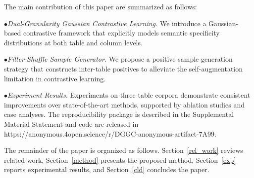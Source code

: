 The main contribution of this paper are summarized as follows:

\noindent $\bullet$\textit{Dual-Granularity Gaussian Contrastive Learning.} We introduce a Gaussian-based contrastive framework that explicitly models semantic specificity distributions at both table and column levels.

\noindent $\bullet$\textit{Filter-Shuffle Sample Generator.} We propose a positive sample generation strategy that constructs inter-table positives to alleviate the self-augmentation limitation in contrastive learning.

\noindent $\bullet$\textit{Experiment Results.} Experiments on three table corpora demonstrate consistent improvements over state-of-the-art methods, supported by ablation studies and case analyses. The reproducibility package is described in the Supplemental Material Statement and code are released in \small{https://anonymous.4open.science/r/DGGC-anonymous-artifact-7A99}. 


The remainder of the paper is organized as follows. Section~\ref{rel_work} reviews related work, Section~\ref{method} presents the proposed method, Section~\ref{exp} reports experimental results, and Section~\ref{cld} concludes the paper.

